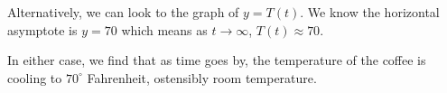 \documentclass{ximera}
\begin{document}
\begin{example}
\begin{explanation}
\begin{enumerate}
 

Alternatively, we can look to the graph of $y = T(t)$.  We know the horizontal asymptote is $y=70$ which means as $t \rightarrow \infty$, $T(t) \approx 70$.

 

In either case, we find that as time goes by,  the temperature of the coffee is cooling to $70^{\circ}$ Fahrenheit, ostensibly room temperature. 

\end{enumerate}

\end{explanation}

\end{example}



\closegraphsfile
\end{document}
